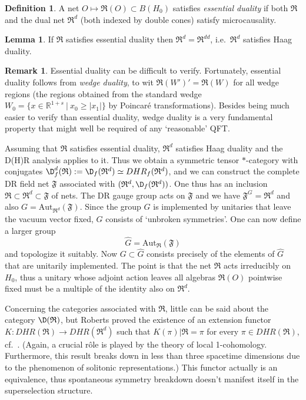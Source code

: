 \documentclass[12pt]{article}
\newcommand{\alg}[1]{\mathfrak{#1}}
\theoremstyle{definition}
\newtheorem{lemma}[thm]{Lemma}
\theoremstyle{definition}
\newtheorem{defn}[thm]{Definition}
\newtheorem{note}[thm]{Remark}
\theoremstyle{remark}
\def\7#1{{\mathbb #1}}
\def\al#1{{\mathfrak #1}}
\newcommand{\Aut}{\mathrm{Aut}}
\newcommand{\rarr}{\rightarrow}
\begin{document}
\begin{defn} A net $O\mapsto\alg{R}(O)\subset B(H_0)$ satisfies \emph{essential
    duality} if both $\alg{R}$ and the dual net $\alg{R}^d$ (both indexed by double
  cones) satisfy microcausality.
\end{defn}

\begin{lemma} If $\alg{R}$ satisfies essential duality then $\alg{R}^d=\alg{R}^{dd}$, i.e.\
$\alg{R}^d$ satisfies Haag duality. 
\end{lemma} 

\begin{note} Essential duality can be difficult to verify. Fortunately, essential
  duality follows from \emph{wedge duality}, to wit $\alg{R}(W')'=\alg{R}(W)$ for all
  wedge regions (the regions obtained from the standard wedge $W_0=\{ x\in\7R^{1+s}\
  | \ x_0\ge|x_1| \}$ by Poincar\'e transformations). Besides being much easier to
  verify than essential duality, wedge duality is a very fundamental property that
  might well be required of any `reasonable' QFT.
\end{note}

Assuming that $\alg{R}$ satisfies essential duality,
$\alg{R}^d$ satisfies Haag duality and the D(H)R
analysis applies to it. Thus we obtain a symmetric
tensor $*$-category with conjugates
$\D_f^d(\alg{R}):=\D_f(\alg{R}^d)\simeq
DHR_f(\alg{R}^d)$, and we can construct the complete DR
field net $\al F$ associated with
$(\alg{R}^d,\D_f(\alg{R}^d))$. One thus has an
inclusion $\alg{R}\subset\alg{R}^d\subset\alg{F}$ of
nets. The DR gauge group acts on $\alg{F}$ and we have
$\alg{F}^G=\alg{R}^d$ and also
$G=\Aut_{\alg{R}^d}(\alg{F})$. Since the group $G$ is
implemented by unitaries that leave the vacuum vector
fixed, $G$ consists of `unbroken symmetries'. One can
now define a larger group
\[ \widehat{G}=\Aut_{\alg{R}}(\alg{F}) \] and topologize it suitably.  Now
$G\subset\widehat{G}$ consists precisely of the elements of $\widehat{G}$ that are
unitarily implemented. The point is that the net $\alg{R}$ acts irreducibly on $H_0$,
thus a unitary whose adjoint action leaves all algebras $\alg{R}(O)$ pointwise fixed
must be a multiple of the identity also on $\alg{R}^d$.

Concerning the categories associated with $\alg{R}$, little can be said about the
category $\D(\alg{R})$, but Roberts proved the existence of an extension functor
$K:DHR(\alg{R})\rarr DHR(\alg{R}^d)$ such that $K(\pi)|\alg{R}=\pi$ for every $\pi\in
DHR(\alg{R})$, cf.\ \cite[\S 3.4]{rob-lec}. (Again, a crucial r\^ole is played by the
theory of local 1-cohomology. Furthermore, this result breaks down in less than three
spacetime dimensions due to the phenomenon of solitonic representations.) This
functor actually is an equivalence, thus spontaneous symmetry breakdown doesn't
manifest itself in the superselection structure.
\end{document}
